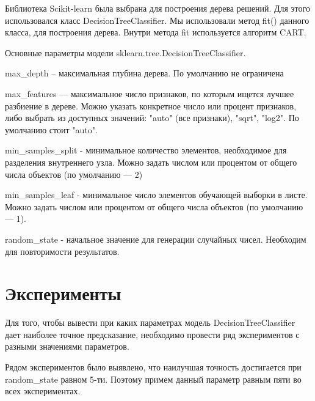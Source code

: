 \documentclass[a4paper,12pt]{article}
\begin{document}
	\vspace{0.5cm}
	Библиотека Scikit-learn была выбрана для построения дерева решений. Для этого использовался класс DecisionTreeClassifier. Мы использовали метод fit() данного класса, для построения дерева. Внутри метода fit используется алгоритм CART.
	
	\vspace{0.5cm}
	Основные параметры модели sklearn.tree.DecisionTreeClassifier.
	
	\vspace{0.5cm}
	max\_depth – максимальная глубина дерева. По умолчанию не ограничена
	
	\vspace{0.5cm}
	max\_features — максимальное число признаков, по которым ищется лучшее разбиение в дереве. Можно указать конкретное число или процент признаков, либо выбрать из доступных значений: "auto" (все признаки), "sqrt", "log2". По умолчанию стоит "auto".
	
	\vspace{0.5cm}
	min\_samples\_split - минимальное количество элементов, необходимое для разделения внутреннего узла. Можно задать числом или процентом от общего числа объектов (по умолчанию — 2)
	
	\vspace{0.5cm}
	min\_samples\_leaf - минимальное число элементов обучающей выборки в листе. Можно задать числом или процентом от общего числа объектов (по умолчанию — 1).
	
	\vspace{0.5cm}
	random\_state - начальное значение для генерации случайных чисел. Необходим для повторимости результатов.


	
\newpage\section{Эксперименты}
	Для того, чтобы вывести при каких параметрах модель DecisionTreeClassifier дает наиболее точное предсказание, необходимо провести ряд экспериментов с разными значениями параметров. 
	
	\vspace{0.5cm}
	Рядом экспериментов было выявлено, что наилучшая точность достигается при random\_state равном 5-ти. Поэтому примем данный параметр равным пяти во всех экспериментах.
	
\end{document}
